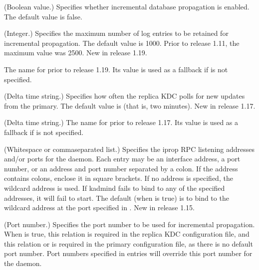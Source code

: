 \documentclass[letterpaper,10pt,english]{sphinxmanual}
\begin{document}
\begin{description}
\sphinxAtStartPar
(Boolean value.)  Specifies whether incremental database
propagation is enabled.  The default value is false.

\sphinxAtStartPar
(Integer.)  Specifies the maximum number of log entries to be
retained for incremental propagation.  The default value is 1000.
Prior to release 1.11, the maximum value was 2500.  New in release
1.19.

\sphinxAtStartPar
The name for  prior to release 1.19.  Its value is
used as a fallback if  is not specified.

\sphinxAtStartPar
(Delta time string.)  Specifies how often the replica KDC polls
for new updates from the primary.  The default value is 
(that is, two minutes).  New in release 1.17.

\sphinxAtStartPar
(Delta time string.)  The name for  prior to
release 1.17.  Its value is used as a fallback if
 is not specified.

\sphinxAtStartPar
(Whitespace\sphinxhyphen{} or comma\sphinxhyphen{}separated list.)  Specifies the iprop RPC
listening addresses and/or ports for the {\hyperref[\detokenize{admin/admin_commands/kadmind:kadmind-8}]{}} daemon.
Each entry may be an interface address, a port number, or an
address and port number separated by a colon.  If the address
contains colons, enclose it in square brackets.  If no address is
specified, the wildcard address is used.  If kadmind fails to bind
to any of the specified addresses, it will fail to start.  The
default (when  is true) is to bind to the wildcard
address at the port specified in .  New in release
1.15.

\sphinxAtStartPar
(Port number.)  Specifies the port number to be used for
incremental propagation.  When  is true, this
relation is required in the replica KDC configuration file, and
this relation or  is required in the primary
configuration file, as there is no default port number.  Port
numbers specified in  entries will override this
port number for the {\hyperref[\detokenize{admin/admin_commands/kadmind:kadmind-8}]{}} daemon.


\end{description}
\end{document}
